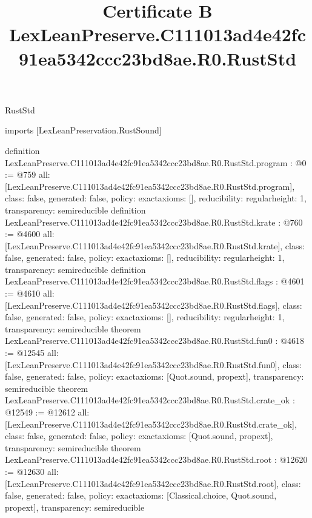 \begin{lexlean}{RustStd}
\title{Certificate B LexLeanPreserve.C111013ad4e42fc91ea5342ccc23bd8ae.R0.RustStd}
\begin{coremodule}
imports [LexLeanPreservation.RustSound]

definition LexLeanPreserve.C111013ad4e42fc91ea5342ccc23bd8ae.R0.RustStd.program : @0 := @759 {
  all: [LexLeanPreserve.C111013ad4e42fc91ea5342ccc23bd8ae.R0.RustStd.program],
  class: false,
  generated: false,
  policy: exact{axioms: []},
  reducibility: regular{height: 1},
  transparency: semireducible
}
definition LexLeanPreserve.C111013ad4e42fc91ea5342ccc23bd8ae.R0.RustStd.krate : @760 := @4600 {
  all: [LexLeanPreserve.C111013ad4e42fc91ea5342ccc23bd8ae.R0.RustStd.krate],
  class: false,
  generated: false,
  policy: exact{axioms: []},
  reducibility: regular{height: 1},
  transparency: semireducible
}
definition LexLeanPreserve.C111013ad4e42fc91ea5342ccc23bd8ae.R0.RustStd.flags : @4601 := @4610 {
  all: [LexLeanPreserve.C111013ad4e42fc91ea5342ccc23bd8ae.R0.RustStd.flags],
  class: false,
  generated: false,
  policy: exact{axioms: []},
  reducibility: regular{height: 1},
  transparency: semireducible
}
theorem LexLeanPreserve.C111013ad4e42fc91ea5342ccc23bd8ae.R0.RustStd.fun0 : @4618 := @12545 {
  all: [LexLeanPreserve.C111013ad4e42fc91ea5342ccc23bd8ae.R0.RustStd.fun0],
  class: false,
  generated: false,
  policy: exact{axioms: [Quot.sound, propext]},
  transparency: semireducible
}
theorem LexLeanPreserve.C111013ad4e42fc91ea5342ccc23bd8ae.R0.RustStd.crate_ok : @12549 := @12612 {
  all: [LexLeanPreserve.C111013ad4e42fc91ea5342ccc23bd8ae.R0.RustStd.crate_ok],
  class: false,
  generated: false,
  policy: exact{axioms: [Quot.sound, propext]},
  transparency: semireducible
}
theorem LexLeanPreserve.C111013ad4e42fc91ea5342ccc23bd8ae.R0.RustStd.root : @12620 := @12630 {
  all: [LexLeanPreserve.C111013ad4e42fc91ea5342ccc23bd8ae.R0.RustStd.root],
  class: false,
  generated: false,
  policy: exact{axioms: [Classical.choice, Quot.sound, propext]},
  transparency: semireducible
}


\end{coremodule}
\end{lexlean}
